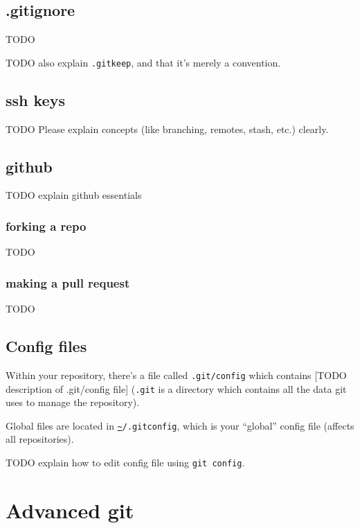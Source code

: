 \documentclass[12pt]{article}
\newcommand{\urlwofont}[1]{\urlstyle{same}\url{#1}}
\begin{document}
\subsection{.gitignore}
TODO

TODO also explain \texttt{.gitkeep}, and that it's merely a convention.


\subsection{ssh keys}
TODO
Please explain concepts (like branching, remotes, stash, etc.) clearly.

\subsection{github}
TODO explain github essentials

\subsubsection{forking a repo}
TODO
\subsubsection{making a pull request}
TODO

\subsection{Config files}
Within your repository, there's a file called \texttt{.git/config} which contains [TODO description of .git/config file] (\texttt{.git} is a directory which contains all the data git uses to manage the repository).

Global files are located in \texttt{\urlwofont{~}/.gitconfig}, which is your ``global'' config file (affects all repositories).

TODO explain how to edit config file using \texttt{git config}.

\section{Advanced git}
\end{document}
